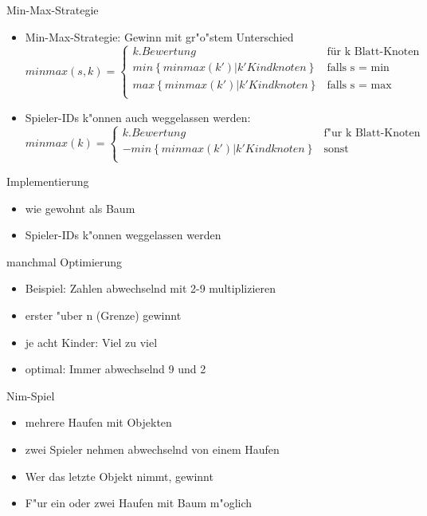 \documentclass[18pt]{beamer}
\begin{document}
\begin{frame}{Min-Max-Strategie}
\begin{itemize}
\item Min-Max-Strategie: Gewinn mit gr"o"stem Unterschied
\begin{equation}
   minmax(s,k) =
   \begin{cases}
     k.Bewertung & \text{für k Blatt-Knoten} \\
     min\left\{minmax(k') | k' Kindknoten\right\} & \text{falls s = min} \\
     max\left\{minmax(k') | k' Kindknoten\right\} & \text{falls s = max} \\
   \end{cases}
\end{equation}
\pause
\item Spieler-IDs k"onnen auch weggelassen werden: 
\begin{equation}
   minmax(k) =
   \begin{cases}
     k.Bewertung & \text{f"ur k Blatt-Knoten} \\
     - min\left\{minmax(k') | k' Kindknoten\right\} & \text{sonst} \\
   \end{cases}
\end{equation}
\end{itemize}
\end{frame}

\begin{frame}{Implementierung}
\begin{itemize}
\item wie gewohnt als Baum

\item Spieler-IDs k"onnen weggelassen werden

\end{itemize}
\end{frame}

\begin{frame}{manchmal Optimierung}
\begin{itemize}
\item Beispiel: Zahlen abwechselnd mit 2-9 multiplizieren
\item erster "uber n (Grenze) gewinnt
\item je acht Kinder: Viel zu viel
\item optimal: Immer abwechselnd 9 und 2
\end{itemize}
\end{frame}

\begin{frame}{Nim-Spiel}
\begin{itemize}
\item mehrere Haufen mit Objekten
\item zwei Spieler nehmen abwechselnd von einem Haufen
\item Wer das letzte Objekt nimmt, gewinnt
\item F"ur ein oder zwei Haufen mit Baum m"oglich 
\end{itemize}
\end{frame}
\end{document}
